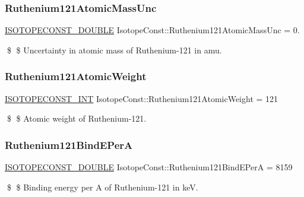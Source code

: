 \subsubsection{\texorpdfstring{Ruthenium121\+Atomic\+Mass\+Unc}{Ruthenium121AtomicMassUnc}}
{\footnotesize\ttfamily \mbox{\hyperlink{group___isotope_const-_macros_ga8f45a7272ce02c0b4c65c44636ed719a}{I\+S\+O\+T\+O\+P\+E\+C\+O\+N\+S\+T\+\_\+\+D\+O\+U\+B\+LE}} Isotope\+Const\+::\+Ruthenium121\+Atomic\+Mass\+Unc = 0.}

\$ \$ Uncertainty in atomic mass of Ruthenium-\/121 in amu. \mbox{\label{group___isotope_const-_ruthenium-_ru121_ga24fc1a66dd3791f2963be7f47b68168f}} 
\subsubsection{\texorpdfstring{Ruthenium121\+Atomic\+Weight}{Ruthenium121AtomicWeight}}
{\footnotesize\ttfamily \mbox{\hyperlink{group___isotope_const-_macros_ga5f18360b3e99483a35c32d789e62621c}{I\+S\+O\+T\+O\+P\+E\+C\+O\+N\+S\+T\+\_\+\+I\+NT}} Isotope\+Const\+::\+Ruthenium121\+Atomic\+Weight = 121}

\$ \$ Atomic weight of Ruthenium-\/121. \mbox{\label{group___isotope_const-_ruthenium-_ru121_ga7838b63794fe4537fb55a93806655b29}} 
\subsubsection{\texorpdfstring{Ruthenium121\+Bind\+E\+PerA}{Ruthenium121BindEPerA}}
{\footnotesize\ttfamily \mbox{\hyperlink{group___isotope_const-_macros_ga8f45a7272ce02c0b4c65c44636ed719a}{I\+S\+O\+T\+O\+P\+E\+C\+O\+N\+S\+T\+\_\+\+D\+O\+U\+B\+LE}} Isotope\+Const\+::\+Ruthenium121\+Bind\+E\+PerA = 8159}

\$ \$ Binding energy per A of Ruthenium-\/121 in keV. \mbox{\label{group___isotope_const-_ruthenium-_ru121_ga06568cc711705d738f8de937ef41779f}} 
